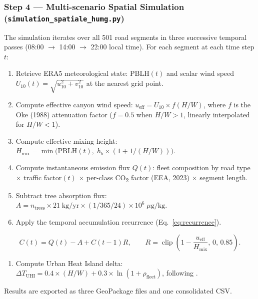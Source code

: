 \documentclass[12pt,a4paper]{article}
\begin{document}
\subsubsection{Step 4 --- Multi-scenario Spatial Simulation (\texttt{simulation\_spatiale\_humg.py})}
The simulation iterates over all 501 road segments in three successive temporal passes (08:00 $\rightarrow$ 14:00 $\rightarrow$ 22:00 local time). For each segment at each time step $t$:

\begin{enumerate}[label=(\alph*)]
  \item Retrieve ERA5 meteorological state: $\mathrm{PBLH}(t)$ and scalar wind speed $U_{10}(t) = \sqrt{u_{10}^2 + v_{10}^2}$ at the nearest grid point.
  \item Compute effective canyon wind speed: $u_\mathrm{eff} = U_{10} \times f(H/W)$, where $f$ is the Oke (1988) attenuation factor ($f = 0.5$ when $H/W > 1$, linearly interpolated for $H/W < 1$).
  \item Compute effective mixing height: $H_\mathrm{mix} = \min\!\bigl(\mathrm{PBLH}(t),\; h_b \times (1 + 1/(H/W))\bigr)$.
  \item Compute instantaneous emission flux $Q(t)$: fleet composition by road type $\times$ traffic factor$(t)$ $\times$ per-class CO\textsubscript{2} factor (EEA, 2023) $\times$ segment length.
  \item Subtract tree absorption flux: $A = n_\mathrm{trees} \times 21\;\mathrm{kg/yr} \times (1/365/24) \times 10^6\;\mu\mathrm{g/kg}$.
  \item Apply the temporal accumulation recurrence (Eq.~\ref{eq:recurrence}).
\end{enumerate}

\begin{equation}
  C(t) = Q(t) - A + C(t-1)R,
  \qquad
  R = \operatorname{clip}\!\left(1-\frac{u_{\mathrm{eff}}}{H_{\mathrm{mix}}},\,0,\,0.85\right).
  \label{eq:recurrence}
\end{equation}

\begin{enumerate}[label=(\alph*),start=7]
  \item Compute Urban Heat Island delta: $\Delta T_\mathrm{UHI} = 0.4 \times (H/W) + 0.3 \times \ln(1 + \rho_\mathrm{fleet})$, following \cite{Oke1988}.
\end{enumerate}

Results are exported as three GeoPackage files and one consolidated CSV.
\end{document}
